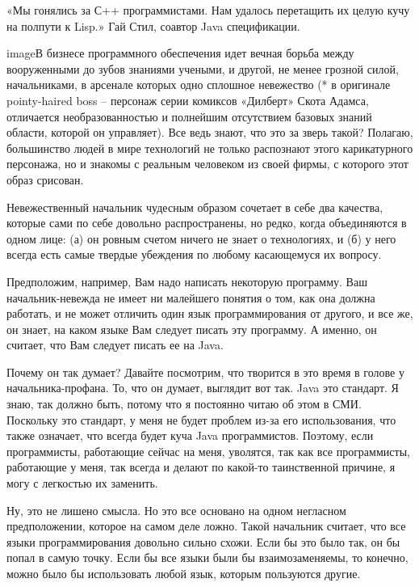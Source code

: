 \documentclass[ebook,12pt,oneside,openany]{memoir}
\begin{document}
\maketitle

«Мы гонялись за С++ программистами. Нам удалось перетащить их целую
кучу на полпути к Lisp.» Гай Стил, соавтор Java спецификации.


imageВ бизнесе программного обеспечения идет вечная борьба между
вооруженными до зубов знаниями учеными, и другой, не менее грозной
силой, начальниками, в арсенале которых одно сплошное невежество (* в
оригинале pointy-haired boss – персонаж серии комиксов «Дилберт» Скота
Адамса, отличается необразованностью и полнейшим отсутствием базовых
знаний области, которой он управляет). Все ведь знают, что это за
зверь такой? Полагаю, большинство людей в мире технологий не только
распознают этого карикатурного персонажа, но и знакомы с реальным
человеком из своей фирмы, с которого этот образ срисован.

Невежественный начальник чудесным образом сочетает в себе два
качества, которые сами по себе довольно распространены, но редко,
когда объединяются в одном лице: (а) он ровным счетом ничего не знает
о технологиях, и (б) у него всегда есть самые твердые убеждения по
любому касающемуся их вопросу.

Предположим, например, Вам надо написать некоторую программу. Ваш
начальник-невежда не имеет ни малейшего понятия о том, как она должна
работать, и не может отличить один язык программирования от другого, и
все же, он знает, на каком языке Вам следует писать эту программу. А
именно, он считает, что Вам следует писать ее на Java.

Почему он так думает? Давайте посмотрим, что творится в это время в
голове у начальника-профана. То, что он думает, выглядит вот так. Java
это стандарт. Я знаю, так должно быть, потому что я постоянно читаю об
этом в СМИ. Поскольку это стандарт, у меня не будет проблем из-за его
использования, что также означает, что всегда будет куча Java
программистов. Поэтому, если программисты, работающие сейчас на меня,
уволятся, так как все программисты, работающие у меня, так всегда и
делают по какой-то таинственной причине, я могу с легкостью их
заменить.

Ну, это не лишено смысла. Но это все основано на одном негласном
предположении, которое на самом деле ложно. Такой начальник считает,
что все языки программирования довольно сильно схожи. Если бы это было
так, он бы попал в самую точку. Если бы все языки были бы
взаимозаменяемы, то конечно, можно было бы использовать любой язык,
которым пользуются другие.
\end{document}
